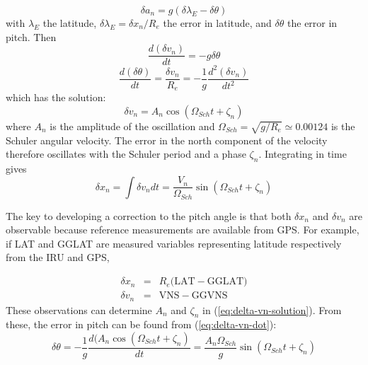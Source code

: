 \documentclass[12pt,twoside,english]{article}\usepackage[]{graphicx}\usepackage[]{color}
\let\OrgIndex\index
\renewcommand*{\index}[1]{\OrgIndex{#1}}
\begin{document}
\begin{equation}
\delta a_{n}=g(\delta\lambda_E-\delta\theta)\label{eq:delta-an} 
\end{equation}
with $\lambda_E$ the latitude, $\delta\lambda_E=\delta x_{n}/R_{e}$ the error in latitude, and $\delta\theta$ the error in pitch. Then\\ 
\begin{equation}
\frac{d(\delta v_{n})}{dt}=-g\delta\theta\label{eq:delta-vn-dot}
\end{equation}
\begin{equation}
\frac{d(\delta\theta)}{dt}=\frac{\delta v_{n}}{R_{e}}=-\frac{1}{g}\frac{d^{2}(\delta v_{n})}{dt^{2}}\label{eq:delta-theta-dot}
\end{equation}
which has the solution:\\ 
\begin{equation}
\delta v_{n}=A_{n}\cos(\Omega_{Sch}t+\zeta_{n})\label{eq:delta-vn-solution} 
\end{equation}
where $A_{n}$ 
is the amplitude of the oscillation and $\Omega_{Sch}=\sqrt{g/R_{e}}\simeq0.00124$
is the Schuler angular
velocity. The error in the north component of the velocity therefore oscillates with the Schuler period and a phase $\zeta_{n}$. Integrating in time gives\\ 
\begin{equation}
\delta x_{n}=\int\delta v_{n}dt=\frac{V_{n}}{\Omega_{Sch}}\sin(\Omega_{Sch}t+\zeta_{n})\label{eq:delta-xn-solution} 
\end{equation}

The key to developing a correction to the pitch angle is that both $\delta x_{n}$ and $\delta v_{n}$ are observable because reference measurements are available from GPS. For example, if LAT and GGLAT are measured variables representing latitude respectively from the IRU and GPS,

\begin{eqnarray}
\delta x_{n} & = & R_{e}(\mathrm{LAT-GGLAT)}\nonumber \\ 
\delta v_{n} & = & \mathrm{VNS-GGVNS}\label{eq:observed-errors} 
\end{eqnarray}
These observations can determine $A_{n}$ and $\zeta_{n}$ in (\ref{eq:delta-vn-solution}). From these, the error in pitch can be found from (\ref{eq:delta-vn-dot}):\\ 
\begin{equation}
\delta\theta=-\frac{1}{g}\frac{d(A_{n}\cos(\Omega_{Sch}t+\zeta_{n})}{dt}=\frac{A_{n}\Omega_{Sch}}{g}\sin(\Omega_{Sch}t+\zeta_{n})\label{eq:solution-delta-theta} 
\end{equation}
\end{document}

